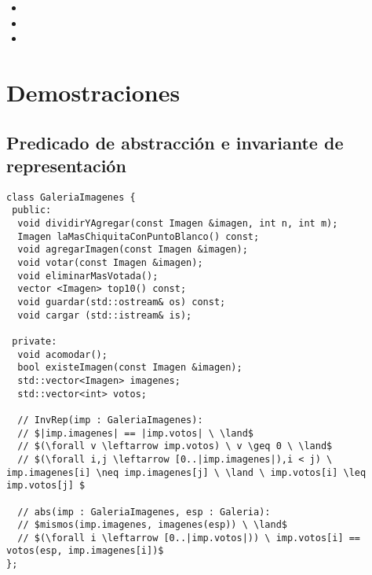 \documentclass[10pt,a4paper,spanish]{article}
\begin{document}
\begin{itemize}
	\item {}

	\item {}

	\item \auxil{listaVotosOrdenados(g: Galeria, imgs: [Imagen]) : [\ent]}{ \newline
	  [votos(g,im) \ | \ i \leftarrow [0..|imgs|),im \leftarrow imgs, cuentaMasVotos(g,imgs,im)==i]
	}

\end{itemize}

\section{Demostraciones}

\subsection{Predicado de abstracción e invariante de representación}

\begin{lstlisting}
class GaleriaImagenes {
 public:
  void dividirYAgregar(const Imagen &imagen, int n, int m);
  Imagen laMasChiquitaConPuntoBlanco() const;
  void agregarImagen(const Imagen &imagen);
  void votar(const Imagen &imagen);
  void eliminarMasVotada();
  vector <Imagen> top10() const;
  void guardar(std::ostream& os) const;
  void cargar (std::istream& is);

 private:
  void acomodar();
  bool existeImagen(const Imagen &imagen);
  std::vector<Imagen> imagenes;
  std::vector<int> votos;

  // InvRep(imp : GaleriaImagenes):
  // $|imp.imagenes| == |imp.votos| \ \land$
  // $(\forall v \leftarrow imp.votos) \ v \geq 0 \ \land$
  // $(\forall i,j \leftarrow [0..|imp.imagenes|),i < j) \ imp.imagenes[i] \neq imp.imagenes[j] \ \land \ imp.votos[i] \leq imp.votos[j] $

  // abs(imp : GaleriaImagenes, esp : Galeria):
  // $mismos(imp.imagenes, imagenes(esp)) \ \land$
  // $(\forall i \leftarrow [0..|imp.votos|)) \ imp.votos[i] == votos(esp, imp.imagenes[i])$
};
\end{lstlisting}
\end{document}
